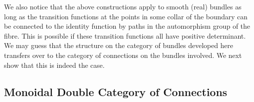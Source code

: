 \documentclass{amsart}
\numberwithin{thm}{section}
\theoremstyle{definition}
\begin{document}
We also notice that the above constructions apply to smooth (real) bundles as
long as the transition functions at the points in some collar of the boundary
can be connected to the identity function by paths in the automorphism group of
the fibre. This is possible if these transition functions all have positive
determinant. We may guess that the
structure on the category of bundles developed here transfers over to the
category of connections on the bundles involved. We next show that this is
indeed the case.

%

\subsection{Monoidal Double Category of Connections}
\end{document}
